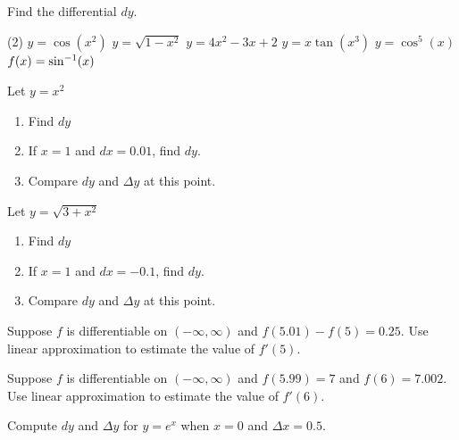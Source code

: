 \documentclass[mathNotesPreamble]{subfiles}
\begin{document}
\begin{ex*}
  Find the differential $dy$.
\end{ex*}
\begin{tasks}[after-item-skip=\stretch{1}, label=~](2)
  \task $y=\cos(x^2)$
  \task $y=\sqrt{1-x^2}$
  \task $y=4x^2-3x+2$
  \task $y=x\tan(x^3)$
  \task $y=\cos^5(x)$
  \task $f(x)=\sin^{-1}(x)$
\end{tasks}
\pagebreak
\begin{ex*}
  Let $y=x^2$
\end{ex*}
\begin{enumerate}[label=\alph*), itemsep=\stretch{1}]
  \item Find $dy$
  \item If $x=1$ and $dx=0.01$, find $dy$.
  \item Compare $dy$ and $\Delta y$ at this point.
\end{enumerate}

\begin{ex*}
  Let $y=\sqrt{3+x^2}$
\end{ex*}
\begin{enumerate}[label=\alph*), itemsep=\stretch{1}]
  \item Find $dy$
  \item If $x=1$ and $dx=-0.1$, find $dy$.
  \item Compare $dy$ and $\Delta y$ at this point.
\end{enumerate}

\pagebreak
\begin{ex*}
  Suppose $f$ is differentiable on $(-\infty,\infty)$ and $f(5.01)-f(5)=0.25$. Use linear approximation to estimate the value of $f'(5)$.
\end{ex*}

\begin{ex*}
  Suppose $f$ is differentiable on $(-\infty,\infty)$ and $f(5.99)=7$ and $f(6)=7.002$. Use linear approximation to estimate the value of $f'(6)$.
\end{ex*}
\pagebreak

\begin{ex*}
  Compute $dy$ and $\Delta y$ for $y=e^x$ when $x=0$ and $\Delta x=0.5$.
\end{ex*}
\end{document}
